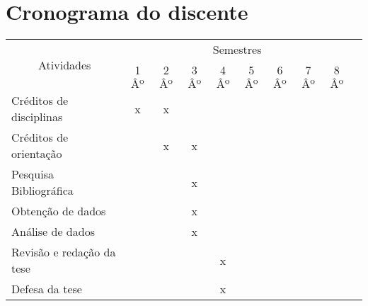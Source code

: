 \documentclass[12pt,a4paper,oneside]{book}
\begin{document}
\chapter{Cronograma do discente}
\begin{center}
    \begin{tabular}{|l|c|c|c|c|c|c|c|c|c|}
        \hline
        \multicolumn{1}{|c|}{\multirow{2}{*}{Atividades}} &
        \multicolumn{8}{c|}{Semestres} \\ \cline{2-9}
         & 1$Âº$ & 2$Âº$ & 3$Âº$ & 4$Âº$ & 5$Âº$ & 6$Âº$ & 7$Âº$ & 8$Âº$ \\ \hline
        Cr\'{e}ditos de disciplinas & x & x & & & & & & \\ \hline
        Cr\'{e}ditos de orienta\c{c}\~ao & & x & x & & & & & \\ \hline
        Pesquisa Bibliogr\'{a}fica & & & x & & & & & \\ \hline
        Obten\c{c}\~ao de dados & & & x & &  & & & \\ \hline
        An\'{a}lise de dados & & & x & & & & & \\ \hline
        Revis\~{a}o e reda\c{c}\~ao da tese & & & & x & & & & \\ \hline
        Defesa da tese & & & & x & & & & \\ \hline
    \end{tabular}
\end{center}
\pagebreak
\medskip
\printbibliography[
    heading=bibnumbered,
    title={Refer\^{e}ncias},
]
\backmatter
\end{document}
